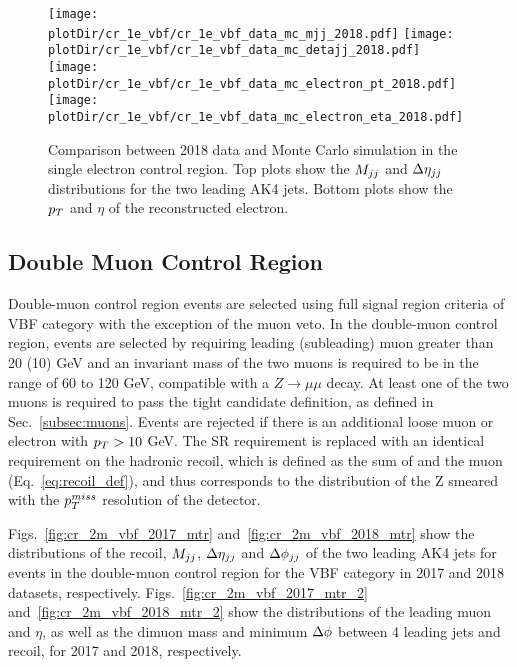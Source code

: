 \begin{figure}[htbp]
    \begin{center}
        \texttt{[image: \\plotDir/cr\_1e\_vbf/cr\_1e\_vbf\_data\_mc\_mjj\_2018.pdf]}
        \texttt{[image: \\plotDir/cr\_1e\_vbf/cr\_1e\_vbf\_data\_mc\_detajj\_2018.pdf]} \\
        \texttt{[image: \\plotDir/cr\_1e\_vbf/cr\_1e\_vbf\_data\_mc\_electron\_pt\_2018.pdf]}
        \texttt{[image: \\plotDir/cr\_1e\_vbf/cr\_1e\_vbf\_data\_mc\_electron\_eta\_2018.pdf]}
    \end{center}
    \caption{Comparison between 2018 data and Monte Carlo simulation in the single electron control region. Top plots
    show the $M_{jj}$ and $\Delta \eta_{jj}$ distributions for the two leading AK4 jets. Bottom plots show the $p_T$ and $\eta$
    of the reconstructed electron.}
    \label{fig:cr_1e_vbf_2018_mtr}
\end{figure}

\clearpage

\subsection{Double Muon Control Region}
\label{sec:selection_cr_2m}

Double-muon control region events are selected using full signal region criteria of VBF category with the exception of the muon veto. 
In the double-muon control region, events are selected by requiring leading (subleading) muon \pt greater than 20 (10) GeV and 
an invariant mass of the two muons is required to be in the range of 60 to 120 GeV, compatible with a $Z \rightarrow \mu \mu$ decay. 
At least one of the two muons is required to 
pass the tight candidate definition, as defined in Sec.~\ref{subsec:muons}. 
Events are rejected if there is an additional loose muon or electron with $p_T > 10$ GeV. 
The SR \ptmiss requirement is replaced with an identical requirement on the hadronic recoil, 
which is defined as the sum of \ptvecmiss 
and the muon \vpt (Eq.~\ref{eq:recoil_def}), and thus corresponds to the distribution of the Z \pt smeared
with the $p_T^{miss}$ resolution of the detector.

Figs.~\ref{fig:cr_2m_vbf_2017_mtr} and~\ref{fig:cr_2m_vbf_2018_mtr} show the distributions of the recoil, $M_{jj}$, $\Delta \eta_{jj}$ and  
$\Delta \phi_{jj}$ of the two leading AK4 jets for events in the double-muon control region for the VBF category 
in 2017 and 2018 datasets, respectively. Figs.~\ref{fig:cr_2m_vbf_2017_mtr_2} and~\ref{fig:cr_2m_vbf_2018_mtr_2} show the distributions 
of the leading muon \pt and $\eta$, as well as the dimuon mass and minimum $\Delta \phi$ between 4 leading jets and recoil, for 2017 and 2018, respectively.


